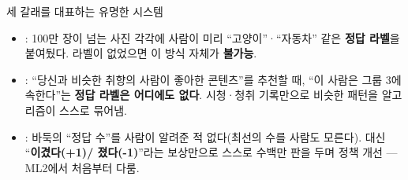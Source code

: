 \begin{frame}{세 갈래를 대표하는 유명한 시스템}
  \begin{itemize}
    \item {}: 100만 장이 넘는 사진 각각에
      사람이 미리 ``고양이''·``자동차'' 같은 \textbf{정답 라벨}을
      붙여뒀다. 라벨이 없었으면 이 방식 자체가 \textbf{불가능}.
    \item {}: ``당신과 비슷한
      취향의 사람이 좋아한 콘텐츠''를 추천할 때, ``이 사람은 그룹 3에
      속한다''는 \textbf{정답 라벨은 어디에도 없다}. 시청·청취 기록만으로
      비슷한 패턴을 알고리즘이 스스로 묶어냄.
    \item {}: 바둑의 ``정답 수''를 사람이 알려준 적
      없다(최선의 수를 사람도 모른다). 대신 ``\textbf{이겼다(+1)/
      졌다(-1)}''라는 보상만으로 스스로 수백만 판을 두며 정책 개선
      --- ML2에서 처음부터 다룸.
  \end{itemize}
\end{frame}
